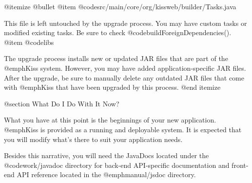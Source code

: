 @itemize @bullet
@item
@code{src/main/core/org/kissweb/builder/Tasks.java}

This file is left untouched by the upgrade process.  You may have
custom tasks or modified existing tasks.  Be sure to check
@code{buildForeignDependencies()}.
@item
@code{libs}

The upgrade process installs new or updated JAR files that are part of
the @emph{Kiss} system.  However, you may have added
application-specific JAR files.  After the upgrade, be sure to manually delete any
outdated JAR files that come with @emph{Kiss} that have been upgraded
by this process.
@end itemize


@section What Do I Do With It Now?

What you have at this point is the beginnings of your new application.
@emph{Kiss} is provided as a running and deployable system.  It is
expected that you will modify what's there to suit your application
needs.

Besides this narrative, you will need the JavaDocs located under the
@code{work/javadoc} directory for back-end API-specific documentation and
front-end API reference located in the @emph{manual/jsdoc} directory.
